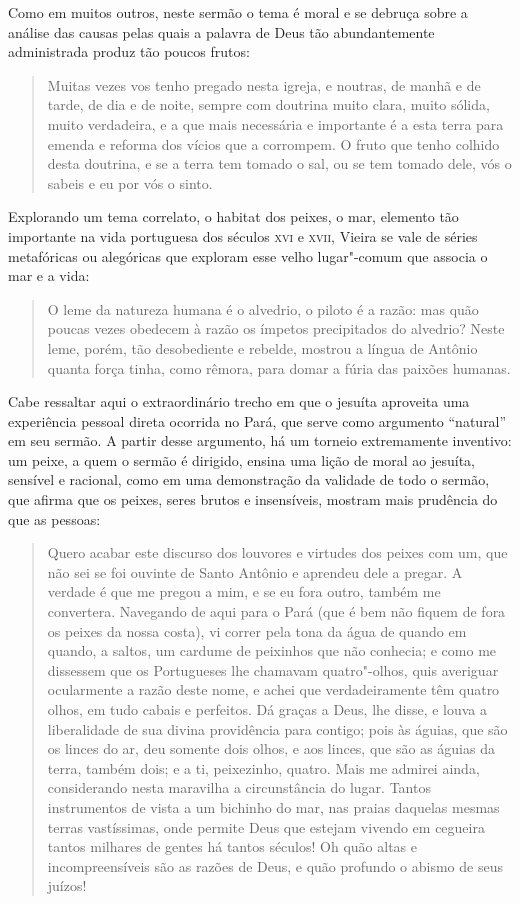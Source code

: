 Como em muitos outros, neste sermão o tema é moral e se debruça sobre a
análise das causas pelas quais a palavra de Deus tão abundantemente
administrada produz tão poucos frutos:

\begin{quote}
Muitas vezes vos tenho pregado nesta igreja, e noutras, de manhã e de
tarde, de dia e de noite, sempre com doutrina muito clara, muito sólida,
muito verdadeira, e a que mais necessária e importante é a esta terra
para emenda e reforma dos vícios que a corrompem. O fruto que tenho
colhido desta doutrina, e se a terra tem tomado o sal, ou se tem tomado
dele, vós o sabeis e eu por vós o sinto.
\end{quote}

Explorando um tema correlato, o habitat dos peixes, o mar, elemento tão
importante na vida portuguesa dos séculos \textsc{xvi} e \textsc{xvii}, Vieira se vale de
séries metafóricas ou alegóricas que exploram esse velho lugar"-comum que
associa o mar e a vida:

\begin{quote}
O leme da natureza humana é o alvedrio, o piloto é a razão: mas quão
poucas vezes obedecem à razão os ímpetos precipitados do alvedrio? Neste
leme, porém, tão desobediente e rebelde, mostrou a língua de Antônio
quanta força tinha, como rêmora, para domar a fúria das paixões
humanas.
\end{quote}

Cabe ressaltar aqui o extraordinário trecho em que o jesuíta aproveita
uma experiência pessoal direta ocorrida no Pará, que serve como
argumento ``natural'' em seu sermão. A partir desse argumento, há um
torneio extremamente inventivo: um peixe, a quem o sermão é dirigido,
ensina uma lição de moral ao jesuíta, sensível e racional, como em uma
demonstração da validade de todo o sermão, que afirma que os peixes,
seres brutos e insensíveis, mostram mais prudência do que as pessoas:

\begin{quote}
Quero acabar este discurso dos louvores e virtudes dos peixes com um,
que não sei se foi ouvinte de Santo Antônio e aprendeu dele a pregar. A
verdade é que me pregou a mim, e se eu fora outro, também me convertera.
Navegando de aqui para o Pará (que é bem não fiquem de fora os peixes da
nossa costa), vi correr pela tona da água de quando em quando, a saltos,
um cardume de peixinhos que não conhecia; e como me dissessem que os
Portugueses lhe chamavam quatro"-olhos, quis averiguar ocularmente a
razão deste nome, e achei que verdadeiramente têm quatro olhos, em tudo
cabais e perfeitos. Dá graças a Deus, lhe disse, e louva a liberalidade
de sua divina providência para contigo; pois às águias, que são os
linces do ar, deu somente dois olhos, e aos linces, que são as águias da
terra, também dois; e a ti, peixezinho, quatro. Mais me admirei ainda,
considerando nesta maravilha a circunstância do lugar. Tantos
instrumentos de vista a um bichinho do mar, nas praias daquelas mesmas
terras vastíssimas, onde permite Deus que estejam vivendo em cegueira
tantos milhares de gentes há tantos séculos! Oh quão altas e
incompreensíveis são as razões de Deus, e quão profundo o abismo de seus
juízos!
\end{quote}

